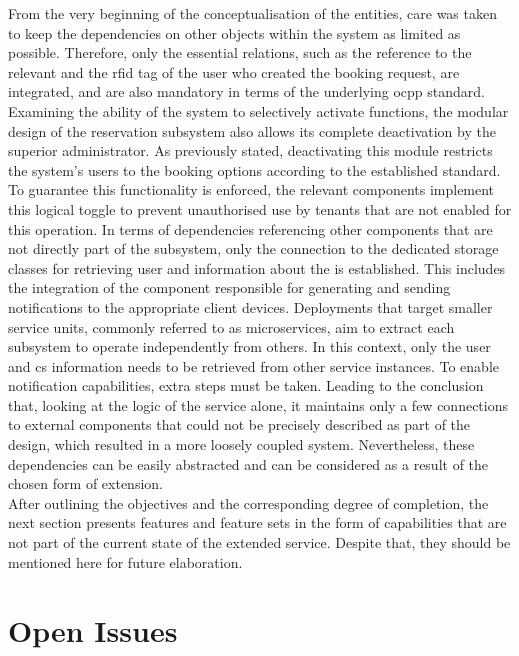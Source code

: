 From the very beginning of the conceptualisation of the entities, care was taken to keep the dependencies on other objects within the system as limited as possible. Therefore, only the essential relations, such as the reference to the relevant  and the \acrshort{rfid} tag of the user who created the booking request, are integrated, and are also mandatory in terms of the underlying \acrshort{ocpp} standard.
Examining the ability of the system to selectively activate functions, the modular design of the reservation subsystem also allows its complete deactivation by the superior administrator. As previously stated, deactivating this module restricts the system's users to the booking options according to the established standard.
To guarantee this functionality is enforced, the relevant components implement this logical toggle to prevent unauthorised use by tenants that are not enabled for this operation.
In terms of dependencies referencing other components that are not directly part of the subsystem, only the connection to the dedicated storage classes for retrieving user and information about the  is established. This includes the integration of the component responsible for generating and sending notifications to the appropriate client devices.
Deployments that target smaller service units, commonly referred to as microservices, aim to extract each subsystem to operate independently from others. In this context, only the user and \acrshort{cs} information needs to be retrieved from other service instances. To enable notification capabilities, extra steps must be taken. 
Leading to the conclusion that, looking at the logic of the service alone, it maintains only a few connections to external components that could not be precisely described as part of the design, which resulted in a more loosely coupled system. Nevertheless, these dependencies can be easily abstracted and can be considered as a result of the chosen form of extension. \\

\noindent After outlining the objectives and the corresponding degree of completion, the next section presents features and feature sets in the form of capabilities that are not part of the current state of the extended service. Despite that, they should be mentioned here for future elaboration.

\section{Open Issues}
\label{ch:Analysis and Validation:sec:Open Issues}

